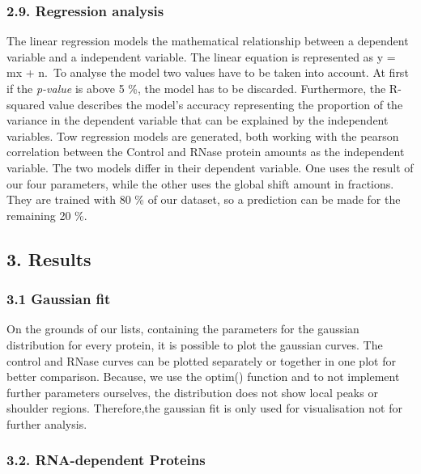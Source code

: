 \documentclass[
  12pt,
]{article}
\begin{document}
\hypertarget{regression-analysis}{%
\subsubsection{2.9. Regression analysis}\label{regression-analysis}}

The linear regression models the mathematical relationship between a
dependent variable and a independent variable. The linear equation is
represented as y = mx + n.~To analyse the model two values have to be
taken into account. At first if the \emph{p-value} is above 5 \%, the
model has to be discarded. Furthermore, the R-squared value describes
the model's accuracy representing the proportion of the variance in the
dependent variable that can be explained by the independent variables.
Tow regression models are generated, both working with the pearson
correlation between the Control and RNase protein amounts as the
independent variable. The two models differ in their dependent variable.
One uses the result of our four parameters, while the other uses the
global shift amount in fractions. They are trained with 80 \% of our
dataset, so a prediction can be made for the remaining 20 \%.

\hypertarget{results}{%
\subsection{3. Results}\label{results}}

\hypertarget{gaussian-fit-1}{%
\subsubsection{3.1 Gaussian fit}\label{gaussian-fit-1}}

On the grounds of our lists, containing the parameters for the gaussian
distribution for every protein, it is possible to plot the gaussian
curves. The control and RNase curves can be plotted separately or
together in one plot for better comparison. Because, we use the optim()
function and to not implement further parameters ourselves, the
distribution does not show local peaks or shoulder regions.
Therefore,the gaussian fit is only used for visualisation not for
further analysis.

\hypertarget{rna-dependent-proteins}{%
\subsubsection{3.2. RNA-dependent
Proteins}\label{rna-dependent-proteins}}
\end{document}
